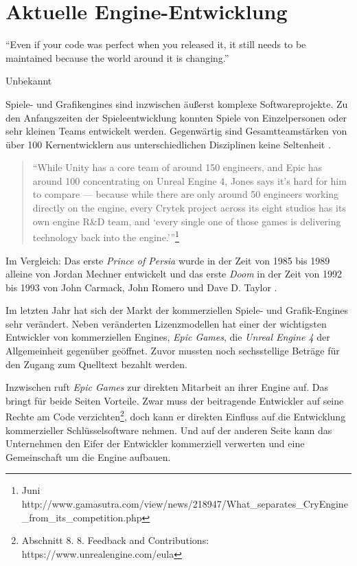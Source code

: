 \chapter{Aktuelle Engine-Entwicklung}
\label{chap:engine-uebersicht}

\epigraph{"`Even if your code was perfect when you released it, it still needs to be maintained because the world around it is changing."'}{Unbekannt}

Spiele- und Grafikengines sind inzwischen äußerst komplexe Softwareprojekte. Zu den Anfangszeiten der Spieleentwicklung konnten Spiele von Einzelpersonen oder sehr kleinen Teams entwickelt werden. Gegenwärtig sind Gesamtteamstärken von über 100 Kernentwicklern aus unterschiedlichen Disziplinen keine Seltenheit \parencite[Kapitel 8, Abschnitt: "`The Problem with Large Teams"']{keith2010agile}.

\begin{quote}
% 
"`While Unity has a core team of around 150 engineers, and Epic has around 100 concentrating on Unreal Engine 4, Jones says it's hard for him to compare --- because while there are only around 50 engineers working directly on the engine, every Crytek project across its eight studios has its own engine R\&D team, and `every single one of those games is delivering technology back into the engine.'"'\footnote{Juni http://www.gamasutra.com/view/news/218947/What\_separates\_CryEngine\_from\_its\_competition.php}
\end{quote}

Im Vergleich: Das erste \textit{Prince of Persia} wurde in der Zeit von 1985 bis 1989 alleine von Jordan Mechner entwickelt \parencite{Mechner1993} und das erste \textit{Doom} in der Zeit von 1992 bis 1993 von John Carmack, John Romero und Dave D. Taylor \parencite{Kushner2003}.

Im letzten Jahr hat sich der Markt der kommerziellen Spiele- und Grafik-Engines sehr verändert. Neben veränderten Lizenzmodellen hat einer der wichtigsten Entwickler von kommerziellen Engines, \textit{Epic Games}, die \textit{Unreal Engine 4} der Allgemeinheit gegenüber geöffnet. Zuvor mussten noch sechsstellige Beträge für den Zugang zum Quelltext bezahlt werden. 

Inzwischen ruft \textit{Epic Games} zur direkten Mitarbeit an ihrer Engine auf. Das bringt für beide Seiten Vorteile. Zwar muss der beitragende Entwickler auf seine Rechte am Code verzichten\footnote{Abschnitt 8. 8. Feedback and Contributions: https://www.unrealengine.com/eula}, doch kann er direkten Einfluss auf die Entwicklung kommerzieller Schlüsselsoftware nehmen. Und auf der anderen Seite kann das Unternehmen den Eifer der Entwickler kommerziell verwerten und eine Gemeinschaft um die Engine aufbauen.

